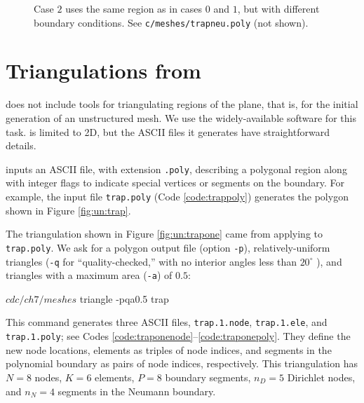 \begin{figure}

\caption{Case $2$ uses the same region as in cases $0$ and $1$, but with different boundary conditions.  See \texttt{c/\CODELOC meshes/trapneu.poly} (not shown).}
\label{fig:un:trapneu}
\end{figure}


\section{Triangulations from \Triangle}

\PETSc does not include tools for triangulating regions of the plane, that is, for the initial generation of an unstructured mesh.  We use the widely-available \Triangle{} software \citep{Shewchuk1996} for this task.  \Triangle is limited to 2D, but the ASCII files it generates have straightforward details.

\Triangle inputs an ASCII file, with extension \texttt{.poly}, describing a polygonal region along with integer flags to indicate special vertices or segments on the boundary.  For example, the input file \texttt{trap.poly} (Code \ref{code:trappoly}) generates the polygon shown in Figure \ref{fig:un:trap}.


The triangulation shown in Figure \ref{fig:un:trapone} came from applying \Triangle to \texttt{trap.poly}.  We ask for a polygon output file (option \texttt{-p}), relatively-uniform triangles (\texttt{-q} for ``quality-checked,'' with no interior angles less than $20^\circ$ \citep{Shewchuk1996}), and triangles with a maximum area (\texttt{-a}) of $0.5$:
\begin{cline}
$ cd c/ch7/meshes
$ triangle -pqa0.5 trap
\end{cline}
This command generates three ASCII files, \texttt{trap.1.node}, \texttt{trap.1.ele}, and \texttt{trap.1.poly}; see Codes \ref{code:traponenode}--\ref{code:traponepoly}.  They define the new node locations, elements as triples of node indices, and segments in the polynomial boundary as pairs of node indices, respectively.  This triangulation has $N=8$ nodes, $K=6$ elements, $P=8$ boundary segments, $n_D=5$ Dirichlet nodes, and $n_N=4$ segments in the Neumann boundary.

